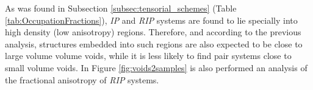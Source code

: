 \documentclass[a4,useAMS,usenatbib,usegraphicx]{latex/mn2e}
\begin{document}
As was found in Subsection \ref{subsec:tensorial_schemes} (Table 
\ref{tab:OccupationFractions}), \textit{IP} and \textit{RIP} systems are 
found to lie specially into high density (low anisotropy) regions. 
Therefore, and according to the previous analysis, structures embedded 
into such regions are also expected to be close to large volume volume 
voids, while it is less likely to find pair systems close to small volume
voids. In Figure \ref{fig:voids2samples} is also performed an analysis of
the fractional anisotropy of \textit{RIP} systems.



\begin{flushleft}
\begin{figure}
\begin{center}


\end{center}
\end{figure}
\end{flushleft}
\end{document}

